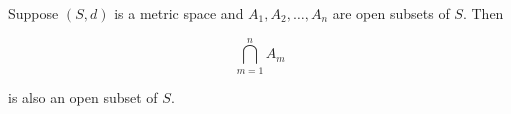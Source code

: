Suppose $(S, d)$ is a metric space and $A_1, A_2, \ldots, A_n$ are open subsets of $S$. Then

$$\bigcap_{m=1}^{n} A_m$$

is also an open subset of $S$.
